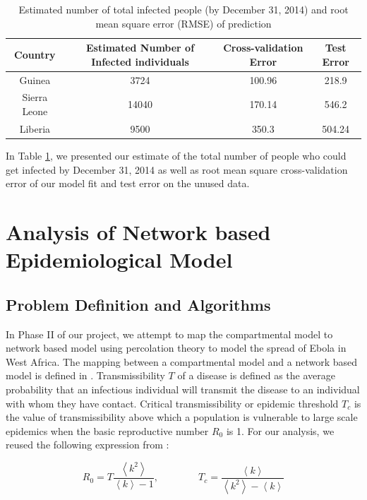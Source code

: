 \documentclass[10pt, journal,onecolumn]{IEEEtran}
\begin{document}
\begin{table}[h]
\caption{Estimated number of total infected people (by December 31, 2014) and root mean square error (RMSE) of prediction}
\centering
\begin{tabular}{|c|c|c|c|}
\hline
Country & Estimated Number of Infected individuals & Cross-validation Error & Test Error
\tabularnewline
\hline
\hline
Guinea & 3724 & 100.96 & 218.9\tabularnewline
\hline
Sierra Leone & 14040 & 170.14 & 546.2\tabularnewline
\hline
Liberia & 9500 & 350.3 & 504.24\tabularnewline
\hline
\end{tabular}
\label{Tb:prediction}

\end{table}

In Table \ref{Tb:prediction}, we presented our estimate of the total number of people who could get
infected by December 31, 2014 as well as root mean square cross-validation error of our model fit
and test error on the unused data.


\section{Analysis of Network based Epidemiological Model} \label{sec:NetworkModel}


\subsection{{Problem Definition and Algorithms}}

In Phase II of our project, we attempt  to map the compartmental model to network based model  using
percolation theory to model the spread of Ebola in West Africa. The mapping between a compartmental
model and a network based model is defined in \citep{meyers2005network}. Transmissibility $T$ of a
disease is defined as the average probability that an infectious individual will transmit the
disease to an individual with whom they have contact. Critical transmissibility or epidemic
threshold $T_c$ is the value of transmissibility above which a population is vulnerable to large
scale  epidemics when the basic reproductive number $R_0$ is 1. For our analysis, we reused the
following expression from \citep{meyers2005network}:

\begin{equation}
R_0 = T  \dfrac{\left\langle k^2 \right\rangle}{\left\langle k \right\rangle-1},
\qquad\qquad
T_c =\dfrac{\left\langle k \right\rangle}{\left\langle k^2 \right\rangle - \left\langle k \right\rangle}
\label{eq:transmissibility}
\end{equation}
\end{document}
